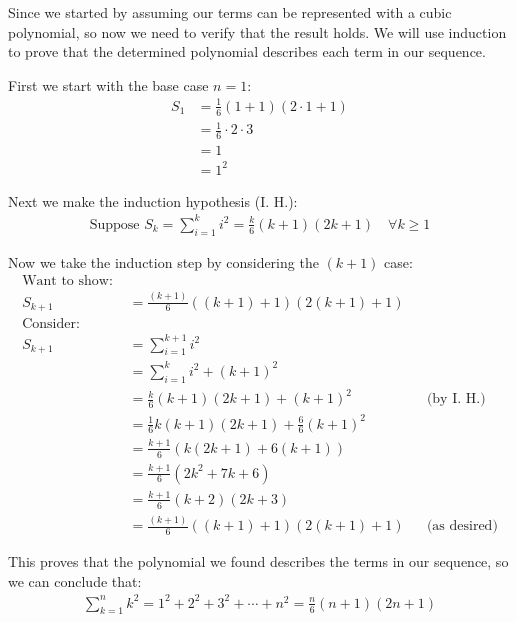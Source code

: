 \documentclass{article}
\begin{document}
Since we started by assuming our terms can be represented with a cubic polynomial, so now we need to verify that the result holds. We will use induction to prove that the determined polynomial describes each term in our sequence.

First we start with the base case \(n=1\):
\[\begin{aligned}
    S_1 &= \frac{1}{6}(1+1)(2\cdot1+1) \\
    &= \frac{1}{6}\cdot2\cdot3 \\
    &= 1 \\
    &= 1^2
\end{aligned}\]

Next we make the induction hypothesis (I. H.):
\[\begin{aligned}
    \text{Suppose } S_k = \sum_{i=1}^{k}i^2 = \frac{k}{6}(k+1)(2k+1) \quad \forall k \geq 1
\end{aligned}\]

Now we take the induction step by considering the \((k+1)\) case:
\[\begin{aligned}
    \text{Want to show: } \\
    S_{k+1} &= \frac{(k+1)}{6}((k+1)+1)(2(k+1)+1) \\
    \text{Consider: } \\
    S_{k+1} &= \sum_{i=1}^{k+1}i^2 \\
    &= \sum_{i=1}^{k}i^2 + (k+1)^2 \\
    &= \frac{k}{6}(k+1)(2k+1) + (k+1)^2 && \text{(by I. H.)} \\
    &= \frac{1}{6}k(k+1)(2k+1)+\frac{6}{6}(k+1)^2 \\
    &= \frac{k+1}{6}(k(2k+1)+6(k+1)) \\
    &= \frac{k+1}{6}(2k^2+7k+6) \\
    &= \frac{k+1}{6}(k+2)(2k+3) \\
    &= \frac{(k+1)}{6}((k+1)+1)(2(k+1)+1) && \text{(as desired)}
\end{aligned}\]

This proves that the polynomial we found describes the terms in our sequence, so we can conclude that:
\[\begin{aligned}
    \sum_{k=1}^{n}k^2 = 1^2 + 2^2 + 3^2 + \cdots + n^2 = \frac{n}{6}(n+1)(2n+1)
\end{aligned}\]
\end{document}
